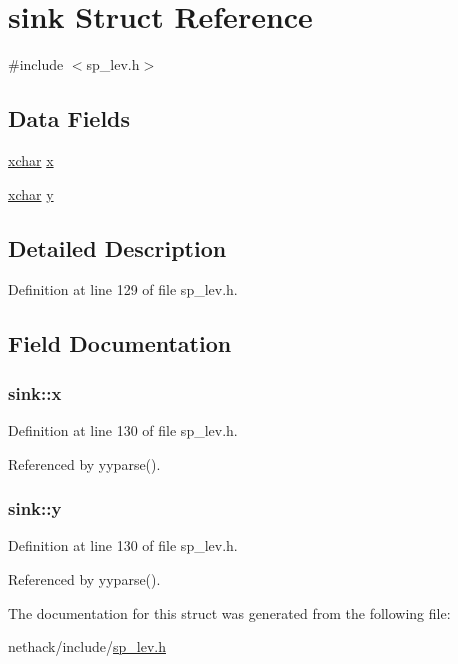 \hypertarget{structsink}{\section{sink Struct Reference}
\label{structsink}
}


{\ttfamily \#include $<$sp\+\_\+lev.\+h$>$}

\subsection*{Data Fields}
\begin{DoxyCompactItemize}
\item 
\hyperlink{global_8h_a2043b7d01ce89f4ee2fa6c345a752d32}{xchar} \hyperlink{structsink_a42373254ba38ee09fe50a8e35bf84575}{x}
\item 
\hyperlink{global_8h_a2043b7d01ce89f4ee2fa6c345a752d32}{xchar} \hyperlink{structsink_ac71df1156c542994966c6ae5280b295a}{y}
\end{DoxyCompactItemize}


\subsection{Detailed Description}


Definition at line 129 of file sp\+\_\+lev.\+h.



\subsection{Field Documentation}
\hypertarget{structsink_a42373254ba38ee09fe50a8e35bf84575}{
\subsubsection[{x}]{ sink\+::x}}\label{structsink_a42373254ba38ee09fe50a8e35bf84575}


Definition at line 130 of file sp\+\_\+lev.\+h.



Referenced by yyparse().

\hypertarget{structsink_ac71df1156c542994966c6ae5280b295a}{
\subsubsection[{y}]{ sink\+::y}}\label{structsink_ac71df1156c542994966c6ae5280b295a}


Definition at line 130 of file sp\+\_\+lev.\+h.



Referenced by yyparse().



The documentation for this struct was generated from the following file\+:\begin{DoxyCompactItemize}
\item 
nethack/include/\hyperlink{sp__lev_8h}{sp\+\_\+lev.\+h}\end{DoxyCompactItemize}
